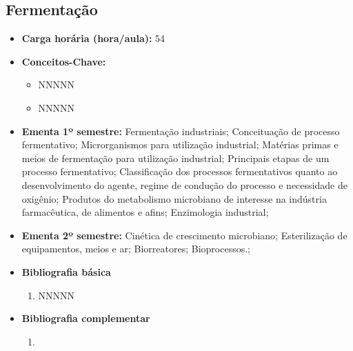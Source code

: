 \documentclass[11pt,fleqn]{book} %
\begin{document}
\subsection{Fermentação}\label{disc:fermentacao}
\begin{itemize}
	\item \textbf{Carga horária (hora/aula):} 54
	\item \textbf{Conceitos-Chave:}
	\begin{itemize}
		\item NNNNN
		\item NNNNN
	\end{itemize}
	\item \textbf{Ementa 1º semestre:}
	Fermentação industriais;
	Conceituação de processo fermentativo; 
	Microrganismos para utilização industrial; 
	Matérias primas e meios de fermentação para utilização industrial; 
	Principais etapas de um processo fermentativo; 
	Classificação dos processos fermentativos quanto ao desenvolvimento do agente, regime de condução do processo e necessidade de oxigênio;
	Produtos do metabolismo microbiano de interesse na indústria farmacêutica, de alimentos e afins; 
	Enzimologia industrial; 
	\item \textbf{Ementa 2º semestre:}	
	Cinética de crescimento microbiano;
	Esterilização de equipamentos, meios e ar;
	Biorreatores;
	Bioprocessos.;
	\item \textbf{Bibliografia básica}
	\begin{enumerate}
		\item NNNNN
	\end{enumerate}
	\item \textbf{Bibliografia complementar}
	\begin{enumerate}
		\item 
	\end{enumerate}	
\end{itemize}


\newpage
\end{document}
